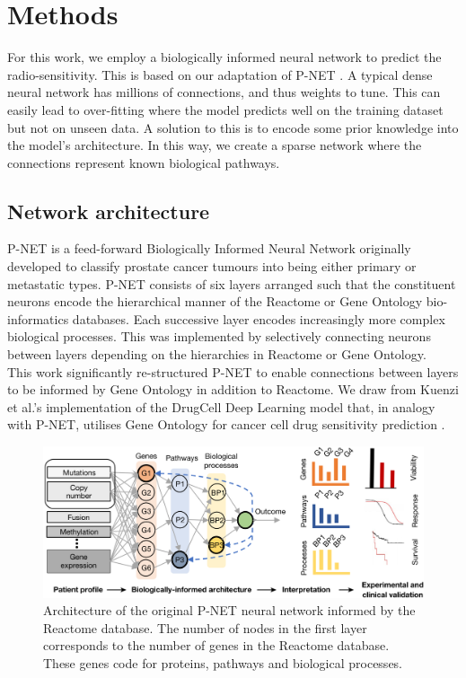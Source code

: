 \documentclass[NOTE, disdraft=true, UKenglish]{\DISCDTLATEXPATH UCLCDTDISdoc}
\begin{document}
\section{Methods}
\label{sec:method}
For this work, we employ a biologically informed neural network to predict the radio-sensitivity. This is based on our adaptation of P-NET \cite{cosmin_thesis}. A typical dense neural network has millions of connections, and thus weights to tune. This can easily lead to over-fitting where the model predicts well on the training dataset but not on unseen data. A solution to this is to encode some prior knowledge into the model's architecture. In this way, we create a sparse network where the connections represent known biological pathways.

\subsection{Network architecture}
P-NET is a feed-forward Biologically Informed Neural Network originally developed to classify prostate cancer tumours into being either primary or metastatic types. P-NET consists of six layers arranged such that the constituent neurons encode the hierarchical manner of the Reactome or Gene Ontology bio-informatics databases. Each successive layer encodes increasingly more complex biological processes. This was implemented by selectively connecting neurons between layers depending on the hierarchies in Reactome or Gene Ontology.\\

This work significantly re-structured P-NET to enable connections between layers to be informed by Gene Ontology in addition to Reactome. We draw from Kuenzi et al.'s implementation of the DrugCell Deep Learning model that, in analogy with P-NET, utilises Gene Ontology for cancer cell drug sensitivity prediction \cite{kuenzi_predicting_2020}.

\begin{figure}
    \centering
    \includegraphics[width=\linewidth]{Figures/pnet_architecture.png}
    \caption{Architecture of the original P-NET neural network \cite{elmarakeby_biologically_2021} informed by the Reactome database. The number of nodes in the first layer corresponds to the number of genes in the Reactome database. These genes code for proteins, pathways and biological processes.}
    \label{fig:1}
\end{figure}
\end{document}
